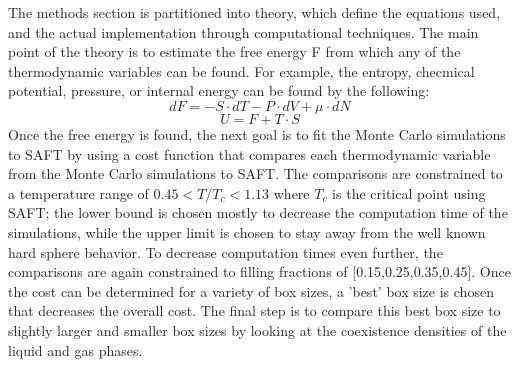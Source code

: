 \newcommand\numberthis{\addtocounter{equation}{1}\tag{\theequation}}
The methods section is partitioned into theory, which define the equations used, and the actual implementation through computational techniques. The main point of the theory is to estimate the free energy F from which any of the thermodynamic variables can be found. For example, the entropy, checmical potential, pressure, or internal energy can be found by the following:
\begin{equation}
dF=-S\cdot dT -P\cdot dV+\mu\cdot dN
\end{equation}
\begin{equation}U=F+T\cdot S 
\end{equation} 
Once the free energy is found, the next goal is to fit the Monte Carlo simulations to SAFT by using a cost function that compares each thermodynamic variable from the Monte Carlo simulations to SAFT. The comparisons are constrained to a temperature range of $0.45<T/T_c<1.13$ where $T_c$ is the critical point using SAFT; the lower bound is chosen mostly to decrease the computation time of the simulations, while the upper limit is chosen to stay away from the well known hard sphere behavior. To decrease computation times even further, the comparisons are again constrained to filling fractions of [0.15,0.25,0.35,0.45]. Once the cost can be determined for a variety of box sizes, a 'best' box size is chosen that decreases the overall cost. The final step is to compare this best box size to slightly larger and smaller box sizes by looking at the coexistence densities of the liquid and gas phases.
